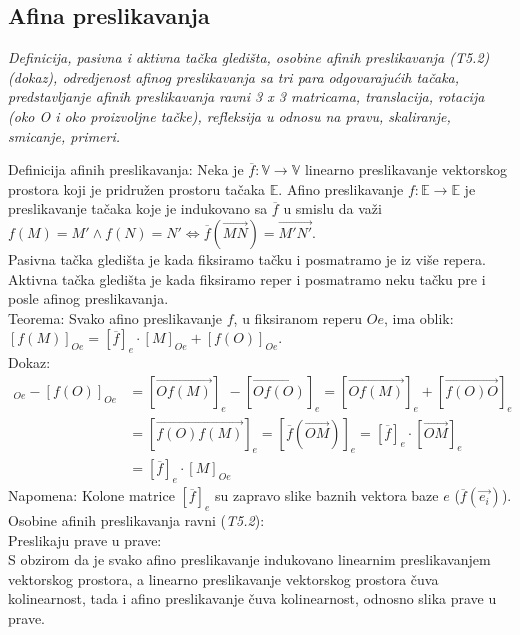 \documentclass[12pt]{article}
\newcommand{\vek}[1]{\overrightarrow{#1}}
\begin{document}
\subsection{Afina preslikavanja}
\textit{Definicija, pasivna i aktivna tačka gledišta, osobine afinih preslikavanja
    (T5.2) (dokaz), odredjenost afinog preslikavanja sa tri para odgovarajućih
    tačaka, predstavljanje afinih preslikavanja ravni 3 x 3 matricama, translacija,
    rotacija (oko O i oko proizvoljne tačke), refleksija u odnosu na pravu,
    skaliranje, smicanje, primeri.}
\par

\vspace*{1cm}

Definicija afinih preslikavanja: Neka je $\overline{f}: \mathbb{V}\rightarrow\mathbb{V}$
linearno preslikavanje vektorskog prostora koji je pridružen prostoru
tačaka $\mathbb{E}$. Afino preslikavanje $f: \mathbb{E}\rightarrow\mathbb{E}$
je preslikavanje tačaka koje je indukovano sa $\overline{f}$ u smislu
da važi $f(M)=M'\land f(N)=N' \iff \overline{f}(\vek{MN})=\vek{M'N'}$.\\
Pasivna tačka gledišta je kada fiksiramo tačku i posmatramo je iz više repera.\\
Aktivna tačka gledišta je kada fiksiramo reper i posmatramo neku tačku pre i posle afinog preslikavanja.\\
Teorema: Svako afino preslikavanje $f$, u fiksiranom reperu $Oe$, ima oblik:\\
$[f(M)]_{Oe}=[\overline{f}]_{e}\cdot[M]_{Oe}+[f(O)]_{Oe}$.\\
Dokaz:
\begin{align*}
    [f(M)]_{Oe}-[f(O)]_{Oe} & =[\vek{Of(M)}]_e-[\vek{Of(O)}]_e =[\vek{Of(M)}]_e+[\vek{f(O)O}]_e                 \\
                            & =[\vek{f(O)f(M)}]_e=[\overline{f}(\vek{OM})]_e =[\overline{f}]_e\cdot[\vek{OM}]_e \\
                            & =[\overline{f}]_e\cdot[M]_{Oe}
\end{align*}
Napomena: Kolone matrice $[\overline{f}]_e$ su zapravo slike baznih vektora baze $e$ ($\overline{f}(\vek{e_i})$).\\
Osobine afinih preslikavanja ravni (\textit{T5.2}):\\
Preslikaju prave u prave:\\
S obzirom da je svako afino preslikavanje indukovano linearnim preslikavanjem
vektorskog prostora, a linearno preslikavanje vektorskog prostora
čuva kolinearnost, tada i afino preslikavanje čuva kolinearnost, odnosno slika prave u prave.\\
\end{document}
